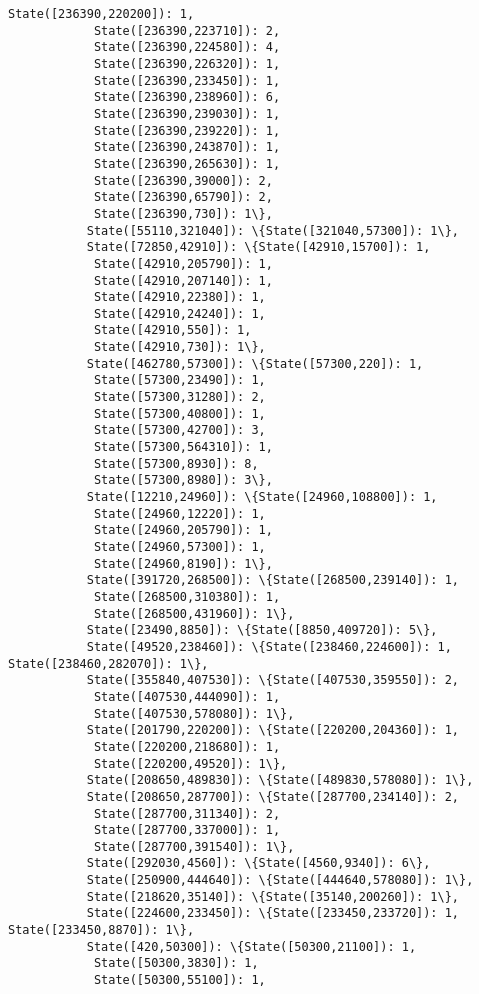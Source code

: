 \documentclass[11pt]{article}
\begin{document}
\begin{Verbatim}[commandchars=\\\{\}]
            State([236390,220200]): 1,
            State([236390,223710]): 2,
            State([236390,224580]): 4,
            State([236390,226320]): 1,
            State([236390,233450]): 1,
            State([236390,238960]): 6,
            State([236390,239030]): 1,
            State([236390,239220]): 1,
            State([236390,243870]): 1,
            State([236390,265630]): 1,
            State([236390,39000]): 2,
            State([236390,65790]): 2,
            State([236390,730]): 1\},
           State([55110,321040]): \{State([321040,57300]): 1\},
           State([72850,42910]): \{State([42910,15700]): 1,
            State([42910,205790]): 1,
            State([42910,207140]): 1,
            State([42910,22380]): 1,
            State([42910,24240]): 1,
            State([42910,550]): 1,
            State([42910,730]): 1\},
           State([462780,57300]): \{State([57300,220]): 1,
            State([57300,23490]): 1,
            State([57300,31280]): 2,
            State([57300,40800]): 1,
            State([57300,42700]): 3,
            State([57300,564310]): 1,
            State([57300,8930]): 8,
            State([57300,8980]): 3\},
           State([12210,24960]): \{State([24960,108800]): 1,
            State([24960,12220]): 1,
            State([24960,205790]): 1,
            State([24960,57300]): 1,
            State([24960,8190]): 1\},
           State([391720,268500]): \{State([268500,239140]): 1,
            State([268500,310380]): 1,
            State([268500,431960]): 1\},
           State([23490,8850]): \{State([8850,409720]): 5\},
           State([49520,238460]): \{State([238460,224600]): 1, State([238460,282070]): 1\},
           State([355840,407530]): \{State([407530,359550]): 2,
            State([407530,444090]): 1,
            State([407530,578080]): 1\},
           State([201790,220200]): \{State([220200,204360]): 1,
            State([220200,218680]): 1,
            State([220200,49520]): 1\},
           State([208650,489830]): \{State([489830,578080]): 1\},
           State([208650,287700]): \{State([287700,234140]): 2,
            State([287700,311340]): 2,
            State([287700,337000]): 1,
            State([287700,391540]): 1\},
           State([292030,4560]): \{State([4560,9340]): 6\},
           State([250900,444640]): \{State([444640,578080]): 1\},
           State([218620,35140]): \{State([35140,200260]): 1\},
           State([224600,233450]): \{State([233450,233720]): 1, State([233450,8870]): 1\},
           State([420,50300]): \{State([50300,21100]): 1,
            State([50300,3830]): 1,
            State([50300,55100]): 1,

\end{Verbatim}
\end{document}

